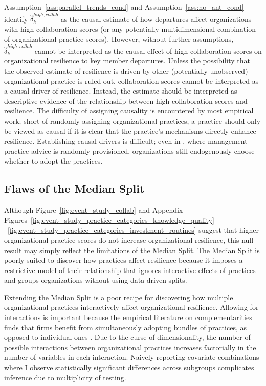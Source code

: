 \documentclass[12pt,notitlepage]{article}
\begin{document}
Assumption~\ref{ass:parallel_trends_cond} and Assumption~\ref{ass:no_ant_cond} identify $\hat{\delta}_k^{high,collab}$ as the causal estimate of how departures affect organizations with high collaboration scores (or any potentially multidimensional combination of organizational practice scores).
However, without further assumptions, $\hat{\delta}_k^{high,collab}$ cannot be interpreted as the causal effect of high collaboration scores on organizational resilience to key member departures. 
Unless the possibility that the observed estimate of resilience is driven by other (potentially unobserved) organizational practice is ruled out, collaboration scores cannot be interpreted as a causal driver of resilience. 
Instead, the estimate should be interpreted as descriptive evidence of the relationship between high collaboration scores and resilience. 
The difficulty of assigning causality is encountered by most empirical work; short of randomly assigning organizational practices, a practice should only be viewed as causal if it is clear that the practice's mechanisms directly enhance resilience.
Establishing causal drivers is difficult; even in \cite{bloom_india_2012}, where management practice advice is randomly provisioned, organizations still endogenously choose whether to adopt the practices.

\subsection{Flaws of the Median Split}\label{sec:median_split_reflection}

Although Figure~\ref{fig:event_study_collab} and Appendix Figures~\ref{fig:event_study_practice_categories_knowledge_quality}--~\ref{fig:event_study_practice_categories_investment_routines}  suggest that higher organizational practice scores do not increase organizational resilience, this null result may simply reflect the limitations of the Median Split.
The Median Split is poorly suited to discover how practices affect resilience because it imposes a restrictive model of their relationship that ignores interactive effects of practices and groups organizations without using data-driven splits.

Extending the Median Split is a poor recipe for discovering how multiple organizational practices interactively affect organizational resilience. 
Allowing for interactions is important because the empirical literature on complementarities finds that firms benefit from simultaneously adopting bundles of practices, as opposed to individual ones \citep{ichniowski_effects_1997}.
Due to the curse of dimensionality, the number of possible interactions between organizational practices increases factorially in the number of variables in each interaction.
Naively reporting covariate combinations where I observe statistically significant differences across subgroups complicates inference due to multiplicity of testing. 
\end{document}
